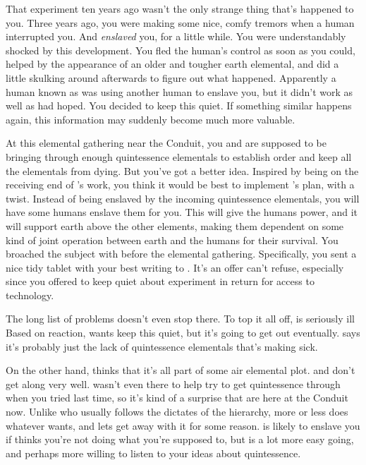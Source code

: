 \documentclass[char]{elementals}
\begin{document}
That experiment ten years ago wasn't the only strange thing that's happened to you.  Three years ago, you were making some nice, comfy tremors when a human interrupted you.  And {\em enslaved} you, for a little while.  You were understandably shocked by this development.  You fled the human's control as soon as you could, helped by the appearance of an older and tougher earth elemental, and did a little skulking around afterwards to figure out what happened.  Apparently a human known as \cMS{\intro} was using another human to enslave you, but it didn't work as well as \cMS{\they} had hoped.  You decided to keep this quiet.  If something similar happens again, this information may suddenly become much more valuable.

At this elemental gathering near the Conduit, you and \cLoyal{} are supposed to be bringing through enough quintessence elementals to establish order and keep all the elementals from dying.  But you've got a better idea.  Inspired by being on the receiving end of \cMS{}'s work, you think it would be best to implement \cLoyal{}'s plan, with a twist.  Instead of being enslaved by the incoming quintessence elementals, you will have some humans enslave them for you.  This will give the humans power, and it will support earth above the other elements, making them dependent on some kind of joint operation between earth and the humans for their survival.  You broached the subject with \cMS{} before the elemental gathering.  Specifically, you sent a nice tidy tablet with your best writing to \cMS{\them}.  It's an offer \cMS{} can't refuse, especially since you offered to keep quiet about \cMS{\their} experiment in return for access to \cMS{\their} technology.

The long list of problems doesn't even stop there.  To top it all off, \cEarthKing{} is seriously ill  Based on \cEarthKing{\their} reaction, \cLoyal{} wants keep this quiet, but it's going to get out eventually.  \cLoyal{} says it's probably just the lack of quintessence elementals that's making \cEarthKing{\them} sick.

On the other hand, \cRogue{\intro} thinks that it's all part of some air elemental plot.  \cLoyal{} and \cRogue{} don't get along very well.  \cRogue{} wasn't even there to help try to get quintessence through when you tried last time, so it's kind of a surprise that \cRogue{\they} are here at the Conduit now.  Unlike \cLoyal{} who usually follows the dictates of the hierarchy, \cRogue{} more or less does whatever  wants, and \cEarthKing{} lets \cRogue{\them} get away with it for some reason.  \cLoyal{} is likely to enslave you if  thinks you're not doing what you're supposed to, but \cRogue{} is a lot more easy going, and perhaps more willing to listen to your ideas about quintessence.
\end{document}
